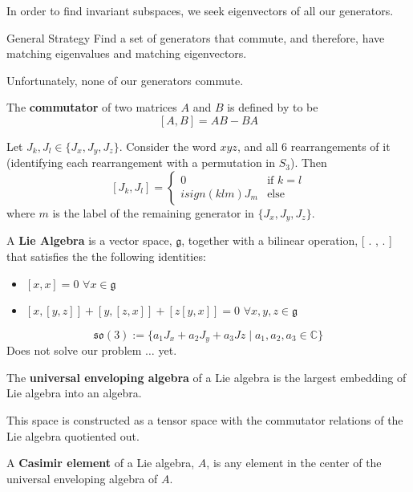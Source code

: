 \documentclass[compress,aspectratio=169,10pt,usenames,dvipsnames]{beamer}
\newcommand{\C}{\mathbb{C}}
\begin{document}
\begin{frame}
\vfill
In order to find invariant subspaces, we seek eigenvectors of all our generators.
\vfill
\begin{block}{General Strategy}
Find a set of generators that commute, and therefore, have matching eigenvalues and matching eigenvectors.
\end{block}
\vfill
Unfortunately, none of our generators commute.
\vfill
\end{frame}
%
%
\begin{frame}
\vfill
\begin{definition}
	The \textbf{commutator} of two matrices $A$ and $B$ is defined by to be 
$$[A,B]=AB-BA$$
\end{definition}
\vfill
\begin{theorem}
	Let $J_k,J_l \in \{J_x,J_y,J_z\}$. Consider the word $xyz$, and all 6 rearrangements of it (identifying each rearrangement with a permutation in $S_3$). Then 
$$[J_k , J_l] = \begin{cases}
					0 & \text{if }k = l \\
					isign(klm)J_m& \text{else}
					\end{cases}$$
where $m$ is the label of the remaining generator in $\{J_x,J_y,J_z\}$.
\end{theorem}
\vfill
\end{frame}


\begin{frame}
\vfill
\begin{definition}
	A \textbf{Lie Algebra} is a vector space, $\mathfrak{g}$, together with a bilinear operation, [ . , . ] that satisfies the the following identities:
\begin{itemize}
	\item$ [x,x] = 0$  $\forall x\in\mathfrak{g}$
	\item $[x,[y,z]] + [y,[z,x]] + [z[y,x]]= 0 $ $\forall x,y,z\in\mathfrak{g}$
\end{itemize}
\end{definition}
\vfill
$$\mathfrak{so}(3) := \{a_1J_x + a_2J_y + a_3Jz \mid a_1,a_2,a_3\in\C\}$$
\vfill
Does not solve our problem $\hdots$ yet.
\end{frame}
%
%
\begin{frame}
\vfill
	\begin{definition}
		The \textbf{universal enveloping algebra} of a Lie algebra is the largest embedding of Lie algebra into an algebra. 
	\end{definition}
\vfill
This space is constructed as a tensor space with the commutator relations of the Lie algebra quotiented out.
\vfill
\begin{definition}
	A \textbf{Casimir element} of a Lie algebra, $A$, is any element in the center of the universal enveloping algebra of $A$.
\end{definition}
\vfill
\end{frame}
\end{document}
